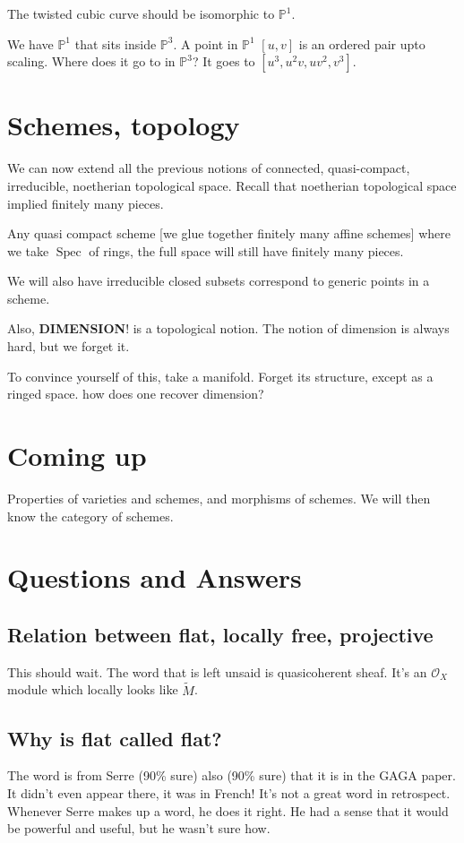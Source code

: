 \documentclass{book}
\renewcommand{\P}{\ensuremath{\mathbb{P}}}
\renewcommand{\O}{\ensuremath{\mathcal{O}}}
\newcommand{\Spec}{\operatorname{Spec}}
\theoremstyle{definition}
\begin{document}
The twisted cubic curve should be isomorphic to $\P^1$.


We have $\P^1$ that sits inside $\P^3$. A point in $\P^1$ $[u, v]$
is an ordered pair upto scaling. Where does it go to in $\P^3$? It goes to $[u^3, u^2v, uv^2, v^3]$.

\section{Schemes, topology}
We can now extend all the previous notions of connected, quasi-compact, 
irreducible, noetherian topological space. Recall that noetherian topological
space implied finitely many pieces.

Any quasi compact scheme [we glue together finitely many affine schemes]
where we take $\Spec$ of rings, the full space will still have finitely many
pieces.

We will also have irreducible closed subsets correspond to generic points
in a scheme.

Also, \textbf{DIMENSION}! is a topological notion. The notion of dimension
is always hard, but we forget it.

To convince yourself of this, take a manifold. Forget its structure,
except as a ringed space. how does one recover dimension?

\section{Coming up}
Properties of varieties and schemes, and morphisms of schemes. We will
then know the category of schemes.

\section{Questions and Answers}
\subsection{Relation between flat, locally free, projective}
This should wait. The word that is left unsaid is quasicoherent sheaf. It's
an $\O_X$ module which locally looks like $\tilde M$.

\subsection{Why is flat called flat?}
The word is from Serre (90\% sure) also (90\% sure) that it is in the GAGA
paper. It didn't even appear there, it was in French! It's not a great word
in retrospect. Whenever Serre makes up a word, he does it right. He had
a sense that it would be powerful and useful, but he wasn't sure how.
\end{document}
